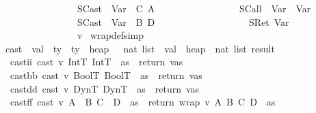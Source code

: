 \begin{isabellebody}
\ \ \ \ \ \ \ \ \ \ \ \ \ \ \ \ {\isacharparenleft}SCast\ {}\ {\isacharparenleft}Var\ {}{\isacharparenright}\ C\ A\ \isanewline
\ \ \ \ \ \ \ \ \ \ \ \ \ \ \ \ {\isacharparenleft}SCall\ {}\ {\isacharparenleft}Var\ {}{\isacharparenright}\ {\isacharparenleft}Var\ {}{\isacharparenright}\isanewline
\ \ \ \ \ \ \ \ \ \ \ \ \ \ \ \ {\isacharparenleft}SCast\ {}\ {\isacharparenleft}Var\ {}{\isacharparenright}\ B\ D\isanewline
\ \ \ \ \ \ \ \ \ \ \ \ \ \ \ \ \ \ \ {\isacharparenleft}SRet\ {\isacharparenleft}Var\ {}{\isacharparenright}{\isacharparenright}{\isacharparenright}{\isacharparenright}{\isacharparenright}\isanewline
\ \ \ \ \ \ \ \ \ \ \ \ \ \ \ \ {\isacharbrackleft}{\isacharparenleft}{}{\isacharcomma}v{\isacharparenright}{\isacharbrackright}{\isacharparenright}{\isachardoublequoteclose}\isanewline
{}\isamarkupfalse \ wrap{\isacharunderscore}def{\isacharbrackleft}simp{\isacharbrackright}\isanewline
\isanewline
{}\isamarkupfalse \ cast\ {\isacharcolon}{\isacharcolon}\ {\isachardoublequoteopen}val\ {\isasymRightarrow}\ ty\ {\isasymRightarrow}\ ty\ {\isasymRightarrow}\ heap\ \ {\isasymRightarrow}\ nat\ list\ {\isasymRightarrow}\ {\isacharparenleft}val\ {\isasymtimes}\ heap\ {\isasymtimes}\ {\isacharparenleft}nat\ list{\isacharparenright}{\isacharparenright}\ result{\isachardoublequoteclose}\ \isanewline
\ \ castii{\isacharcolon}\ {\isachardoublequoteopen}cast\ v\ IntT\ IntT\ {\isasymmu}\ as\ {\isacharequal}\ return\ {\isacharparenleft}v{\isacharcomma}{\isasymmu}{\isacharcomma}as{\isacharparenright}{\isachardoublequoteclose}\ {\isacharbar}\isanewline
\ \ castbb{\isacharcolon}\ {\isachardoublequoteopen}cast\ v\ BoolT\ BoolT\ {\isasymmu}\ as\ {\isacharequal}\ return\ {\isacharparenleft}v{\isacharcomma}{\isasymmu}{\isacharcomma}as{\isacharparenright}{\isachardoublequoteclose}\ {\isacharbar}\isanewline
\ \ castdd{\isacharcolon}\ {\isachardoublequoteopen}cast\ v\ DynT\ DynT\ {\isasymmu}\ as\ {\isacharequal}\ return\ {\isacharparenleft}v{\isacharcomma}{\isasymmu}{\isacharcomma}as{\isacharparenright}{\isachardoublequoteclose}\ {\isacharbar}\isanewline
\ \ castff{\isacharcolon}\ {\isachardoublequoteopen}cast\ v\ {\isacharparenleft}A\ {\isasymrightarrow}\ B{\isacharparenright}\ {\isacharparenleft}C\ {\isasymrightarrow}\ D{\isacharparenright}\ {\isasymmu}\ as\ {\isacharequal}\ return\ {\isacharparenleft}wrap\ v\ A\ B\ C\ D{\isacharcomma}\ {\isasymmu}{\isacharcomma}\ as{\isacharparenright}{\isachardoublequoteclose}\ {\isacharbar}\isanewline

\end{isabellebody}
